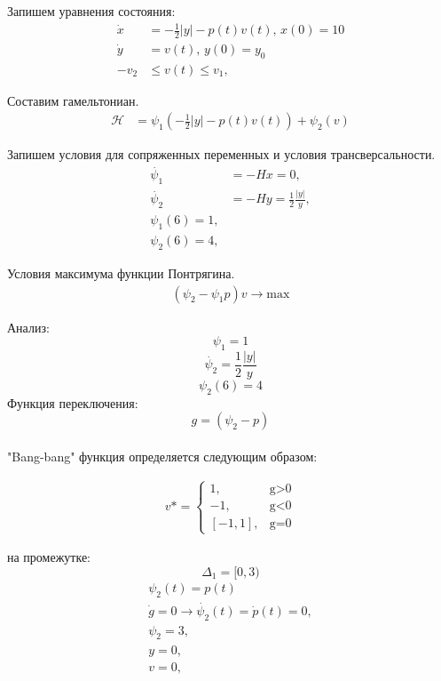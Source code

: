 Запишем уравнения состояния:
\begin{align}
    \Dot{x} & = - \frac{1}{2}|y| - p(t) v(t),\, x(0) = 10 \\
    \Dot{y} & = v(t), \, y(0) = y_{0}\\
    - v_2 & \le v(t) \le v_1,
\end{align}     

Составим гамельтониан. 
\begin{align}
    \mathcal{H} & = \psi_{1} (- \frac{1}{2}|y| - p(t) v(t)) + \psi_{2} (v)
\end{align} 

Запишем условия для сопряженных переменных и условия трансверсальности.
\begin{align}
    \Dot{\psi_{1}} & = -H x = 0,\\
    \Dot{\psi_{2}} & = -H y =  \frac{1}{2}\frac{|y|}{y},\\
    {\psi_{1}(6)} = 1,\\
    {\psi_{2}(6)} = 4,
\end{align} 

Условия максимума функции Понтрягина.
\begin{align}
    (\psi_{2} - \psi_{1} p)v\to \mathrm{max}
\end{align} 

Анализ:
$$\psi_1=1$$
$$\Dot {\psi_{2}}= \frac{1}{2}\frac{|y|}{y}$$
$$\psi_{2}(6)=4$$ 
Функция переключения:\\
$$ g = (\psi_{2} - p) $$\\

"Bang-bang" функция определяется следующим образом:

\begin{align}
v* = 
 \begin{cases}
   1, &\text{g>0}\\
   -1, &\text{g<0}\\
   [-1,1], &\text{g=0}
 \end{cases}
\end{align}

 
на промежутке: $$ \Delta_{1} = [0,3)$$
\begin{align}
\psi_{2}(t) = p(t)\\
\Dot{g} = 0 \rightarrow \Dot{\psi_{2}}(t) = \Dot{p}(t) = 0, \\
\psi_{2} = 3, \\
y = 0, \\
v = 0, \\
\end{align}

